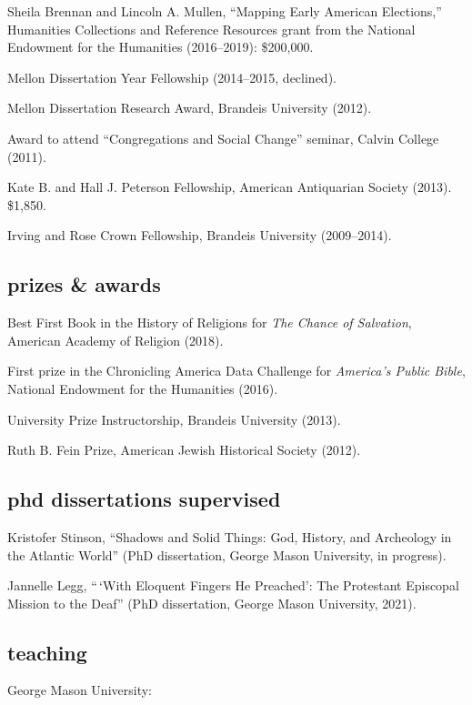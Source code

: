 \documentclass[11pt]{article}
\begin{document}
Sheila Brennan and Lincoln A. Mullen, ``Mapping Early American Elections,'' Humanities Collections and Reference Resources grant from the National Endowment for the Humanities (2016--2019): \$200,000. 

Mellon Dissertation Year Fellowship (2014--2015, declined).

Mellon Dissertation Research Award, Brandeis University (2012).

Award to attend ``Congregations and Social Change'' seminar, Calvin College 
(2011).

Kate B. and Hall J. Peterson Fellowship, American Antiquarian Society (2013). \$1,850.

Irving and Rose Crown Fellowship, Brandeis University (2009--2014).

\subsection{prizes \& awards}\label{prizes-and-awards}

Best First Book in the History of Religions for \emph{The Chance of Salvation}, American Academy of Religion (2018).

First prize in the Chronicling America Data Challenge for \emph{America's Public Bible}, National Endowment for the Humanities (2016).

University Prize Instructorship, Brandeis University (2013).

Ruth B. Fein Prize, American Jewish Historical Society (2012). 

\subsection{phd dissertations supervised}\label{dissertations}

Kristofer Stinson, ``Shadows and Solid Things: God, History, and Archeology in the Atlantic World'' (PhD dissertation, George Mason University, in progress).

Jannelle Legg, ``\,`With Eloquent Fingers He Preached': 
The Protestant Episcopal Mission to the Deaf'' (PhD dissertation, George Mason University, 2021).

\subsection{teaching}\label{teaching}

George Mason University:

\vspace{-0.15in}
\end{document}
